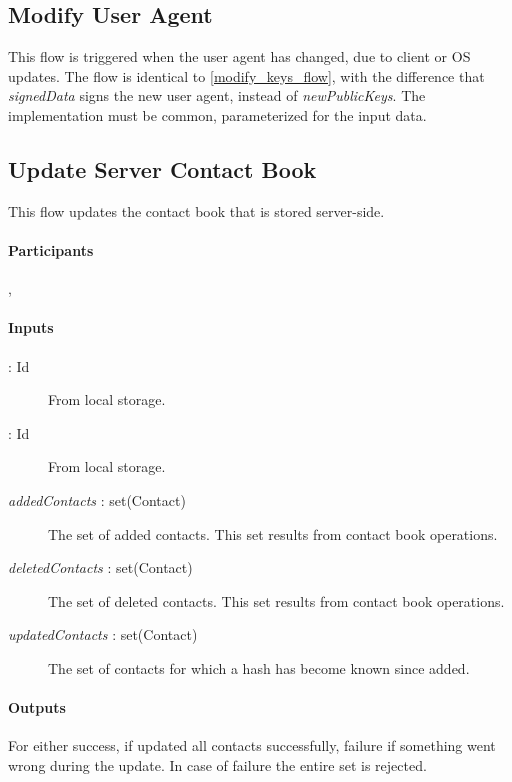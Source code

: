 \documentclass[a4paper,10pt]{article}
\newcommand{\signedData}{\emph{signedData}}
\newcommand{\newPublicKeys}{\emph{newPublicKeys}}
\newcommand{\userId}[1]{\parenthesize{userId}{#1}}
\newcommand{\clientId}[1]{\parenthesize{clientId}{#1}}
\newcommand{\addedContacts}{{\em addedContacts}}
\newcommand{\deletedContacts}{{\em deletedContacts}}
\newcommand{\updatedContacts}{{\em updatedContacts}}
\begin{document}
\subsection{Modify User Agent}
\label{modify_user_agent_flow}
This flow is triggered when the user agent has changed, due to client or OS updates. The flow is identical to \ref{modify_keys_flow}, with the difference that \signedData{} 
signs the new user agent, instead of \newPublicKeys{}. The implementation must be common, parameterized for the input data.

\subsection{Update Server Contact Book}
This flow updates the contact book that is stored server-side.

\paragraph{Participants} , \Server{}

\paragraph{Inputs}
\SpecialItem
\begin{description}
 \item[\userId{A} : Id] From  local storage.
 \item[\clientId{A} : Id] From  local storage.
 \item[\addedContacts{} : set(Contact)] The set of added contacts. This set results from contact book operations.
 \item[\deletedContacts{} : set(Contact)] The set of deleted contacts. This set results from contact book operations.
 \item[\updatedContacts{} : set(Contact)] The set of contacts for which a hash has become known since added.
\end{description}

\paragraph{Outputs}
For  either success, if \Server{} updated all contacts successfully, failure if something went wrong during the update. In case of failure the entire set is rejected.
\end{document}
